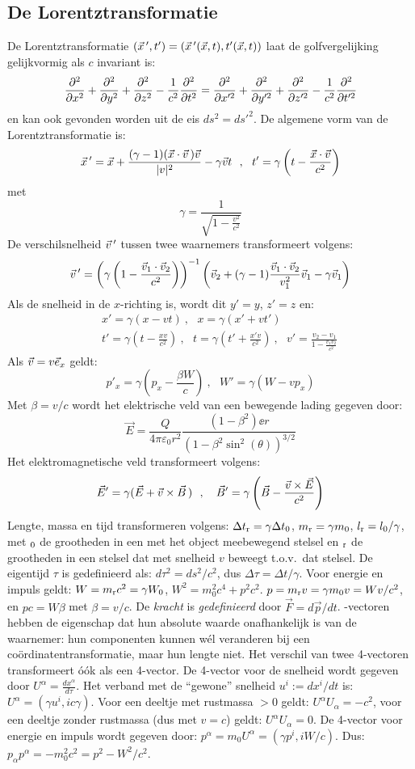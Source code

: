 \subsection{De Lorentztransformatie}
De Lorentztransformatie $(\vec{x}\,',t')=(\vec{x}\,'(\vec{x},t),t'(\vec{x},t))$
laat de golfvergelijking gelijkvormig als $c$ invariant is:
\[
\frac{\partial^2 }{\partial x^2}+\frac{\partial^2 }{\partial y^2}+\frac{\partial^2 }{\partial z^2}-\frac{1}{c^2}\frac{\partial^2 }{\partial t^2}=
\frac{\partial^2 }{\partial x'^2}+\frac{\partial^2 }{\partial y'^2}+\frac{\partial^2 }{\partial z'^2}-\frac{1}{c^2}\frac{\partial^2 }{\partial t'^2}
\]
en kan ook gevonden worden uit de eis $ds^2=ds'^2$. De algemene vorm van de
Lorentztransformatie is:
\[
\vec{x}\,'=\vec{x}+\frac{(\gamma-1)(\vec{x}\cdot\vec{v}\,)\vec{v}}{|v|^2}-\gamma\vec{v} t~~,~~
t'=\gamma\left(t-\frac{\vec{x}\cdot\vec{v}}{c^2}\right)
\]
met
\[
\gamma=\frac{1}{\sqrt{1-\frac{\displaystyle v^2}{\displaystyle c^2}}}
\]
De verschilsnelheid $\vec{v}\,'$ tussen twee waarnemers transformeert volgens:
\[
\vec{v}\,'=\left(\gamma\left(1-\frac{\vec{v}_1\cdot\vec{v}_2}{c^2}\right)\right)^{-1}
\left(\vec{v}_2+(\gamma-1)\frac{\vec{v}_1\cdot\vec{v}_2}{v_1^2}\vec{v}_1-\gamma\vec{v}_1\right)
\]
Als de snelheid in de $x$-richting is, wordt dit $y'=y$, $z'=z$ en:
\begin{eqnarray*}
&&x'=\gamma(x-vt)~,~~~x=\gamma(x'+vt')\\
&&t'=\gamma\left(t-\displaystyle\frac{xv}{c^2}\right)~,~~~t=\gamma\left(t'+\displaystyle\frac{x'v}{c^2}\right)~,~~~
v'=\frac{\displaystyle v_2-v_1}{\displaystyle 1-\frac{v_1v_2}{c^2}}
\end{eqnarray*}
Als $\vec{v}=v\vec{e}_x$ geldt:
\[
p'_x=\gamma\left(p_x-\frac{\beta W}{c}\right)~,~~~W'=\gamma(W-vp_x)
\]
Met $\beta=v/c$ wordt het elektrische veld van een bewegende lading gegeven
door:
\[
\vec{E}=\frac{Q}{4\pi\varepsilon_0r^2}\frac{(1-\beta^2)\ee{r}}{(1-\beta^2\sin^2(\theta))^{3/2}}
\]
Het elektromagnetische veld transformeert volgens:
\[
\vec{E}'=\gamma(\vec{E}+\vec{v}\times\vec{B}\,)~~,~~~
\vec{B}'=\gamma\left(\vec{B}-\frac{\vec{v}\times\vec{E}}{c^2}\right)
\]
Lengte, massa en tijd transformeren volgens:
$\Delta t_{\rm r}=\gamma\Delta t_{\rm 0}$, $m_{\rm r}=\gamma m_0$,
$l_{\rm r}=l_0/\gamma$, met $_{\rm 0}$ de grootheden in een met het object
meebewegend stelsel en $_{\rm r}$ de grootheden in een stelsel dat met
snelheid $v$ beweegt t.o.v.\ dat stelsel. De eigentijd $\tau$ is gedefinieerd
als: $d\tau^2=ds^2/c^2$, dus $\Delta\tau=\Delta t/\gamma$. Voor energie en
impuls geldt: $W=m_{\rm r}c^2=\gamma W_0$, $W^2=m_0^2c^4+p^2c^2$. $p=m_{\rm
r}v=\gamma m_0v=Wv/c^2$, en $pc=W\beta$ met $\beta=v/c$. De {\it kracht} is
{\it gedefinieerd} door $\vec{F}=d\vec{p}/dt$.
-vectoren hebben de eigenschap dat hun absolute waarde onafhankelijk is
van de waarnemer: hun componenten kunnen w\'el veranderen bij een
co\"ordinatentransformatie, maar hun lengte niet. Het verschil van twee
4-vectoren transformeert \'o\'ok als een 4-vector. De 4-vector voor de
snelheid wordt gegeven door $\displaystyle U^\alpha=\frac{dx^\alpha}{d\tau}$.
Het verband met de ``gewone'' snelheid $u^i:=dx^i/dt$ is:
$U^\alpha=(\gamma u^i,ic\gamma)$. Voor een deeltje met rustmassa $>0$ geldt:
$U^\alpha U_\alpha=-c^2$, voor een deeltje zonder rustmassa (dus met $v=c$)
geldt: $U^\alpha U_\alpha=0$. De 4-vector voor energie en impuls wordt
gegeven door: $p^\alpha=m_0U^\alpha=(\gamma p^i,iW/c)$. Dus:
$p_\alpha p^\alpha=-m_0^2c^2=p^2-W^2/c^2$.

